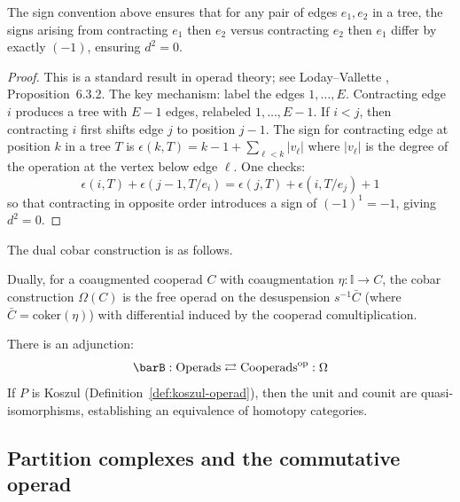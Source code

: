 \begin{lemma}\label{lem:sign-consistency-bar}
The sign convention above ensures that for any pair of edges $e_1, e_2$ in a tree, the signs arising from contracting $e_1$ then $e_2$ versus contracting $e_2$ then $e_1$ differ by exactly $(-1)$, ensuring $d^2 = 0$.
\end{lemma}

\begin{proof}
This is a standard result in operad theory; see Loday--Vallette \cite{LV12}, Proposition~6.3.2. The key mechanism: label the edges $1, \ldots, E$. Contracting edge $i$ produces a tree with $E-1$ edges, relabeled $1, \ldots, E-1$. If $i < j$, then contracting $i$ first shifts edge $j$ to position $j-1$. The sign for contracting edge at position $k$ in a tree $T$ is $\epsilon(k,T) = k - 1 + \sum_{\ell < k} |v_\ell|$ where $|v_\ell|$ is the degree of the operation at the vertex below edge $\ell$. One checks:
\[\epsilon(i, T) + \epsilon(j-1, T/e_i) = \epsilon(j, T) + \epsilon(i, T/e_j) + 1\]
so that contracting in opposite order introduces a sign of $(-1)^1 = -1$, giving $d^2 = 0$.
\end{proof}

The dual cobar construction is as follows.

\begin{definition}
Dually, for a coaugmented cooperad $C$ with coaugmentation $\eta : \mathbb{I} \to C$, the cobar construction $\Omega(C)$ is the free operad on the desuspension $s^{-1}\bar{C}$ (where $\bar{C} = \text{coker}(\eta)$) with differential induced by the cooperad comultiplication.
\end{definition}

\begin{theorem}\label{thm:bar-cobar-adjunction-operadic}
There is an adjunction:
\[
\barB : \text{Operads} \rightleftarrows \text{Cooperads}^{\text{op}} : \Omega
\]
If $P$ is Koszul (Definition~\ref{def:koszul-operad}), then the unit and counit are quasi-isomorphisms, establishing an equivalence of homotopy categories.
\end{theorem}

\subsection{Partition complexes and the commutative operad}

